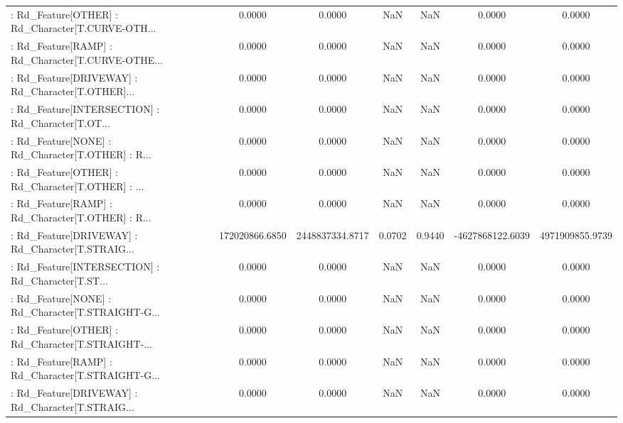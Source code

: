 \begin{longtable}{p{4cm}cccccc}
 : Rd\_Feature[OTHER] : Rd\_Character[T.CURVE-OTH... &            0.0000 &            0.0000 &     NaN &          NaN &             0.0000 &            0.0000 \\
 : Rd\_Feature[RAMP] : Rd\_Character[T.CURVE-OTHE... &            0.0000 &            0.0000 &     NaN &          NaN &             0.0000 &            0.0000 \\
 : Rd\_Feature[DRIVEWAY] : Rd\_Character[T.OTHER]... &            0.0000 &            0.0000 &     NaN &          NaN &             0.0000 &            0.0000 \\
 : Rd\_Feature[INTERSECTION] : Rd\_Character[T.OT... &            0.0000 &            0.0000 &     NaN &          NaN &             0.0000 &            0.0000 \\
 : Rd\_Feature[NONE] : Rd\_Character[T.OTHER] : R... &            0.0000 &            0.0000 &     NaN &          NaN &             0.0000 &            0.0000 \\
 : Rd\_Feature[OTHER] : Rd\_Character[T.OTHER] : ... &            0.0000 &            0.0000 &     NaN &          NaN &             0.0000 &            0.0000 \\
 : Rd\_Feature[RAMP] : Rd\_Character[T.OTHER] : R... &            0.0000 &            0.0000 &     NaN &          NaN &             0.0000 &            0.0000 \\
 : Rd\_Feature[DRIVEWAY] : Rd\_Character[T.STRAIG... &    172020866.6850 &   2448837334.8717 &  0.0702 &       0.9440 &   -4627868122.6039 &   4971909855.9739 \\
 : Rd\_Feature[INTERSECTION] : Rd\_Character[T.ST... &            0.0000 &            0.0000 &     NaN &          NaN &             0.0000 &            0.0000 \\
 : Rd\_Feature[NONE] : Rd\_Character[T.STRAIGHT-G... &            0.0000 &            0.0000 &     NaN &          NaN &             0.0000 &            0.0000 \\
 : Rd\_Feature[OTHER] : Rd\_Character[T.STRAIGHT-... &            0.0000 &            0.0000 &     NaN &          NaN &             0.0000 &            0.0000 \\
 : Rd\_Feature[RAMP] : Rd\_Character[T.STRAIGHT-G... &            0.0000 &            0.0000 &     NaN &          NaN &             0.0000 &            0.0000 \\
 : Rd\_Feature[DRIVEWAY] : Rd\_Character[T.STRAIG... &            0.0000 &            0.0000 &     NaN &          NaN &             0.0000 &            0.0000 \\

\end{longtable}
